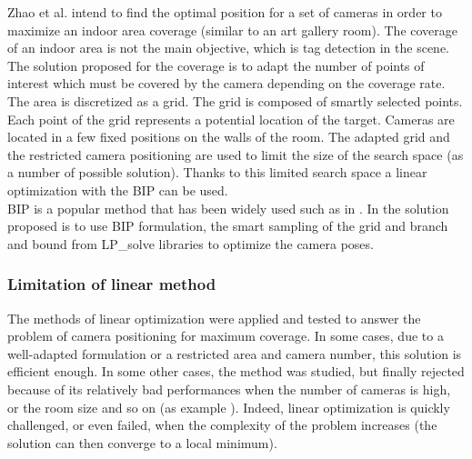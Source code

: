 Zhao  et al. \cite{22*zhao2008} intend to find the optimal position for a set of cameras in order to maximize an indoor area coverage (similar to an art gallery room). The coverage of an indoor area is not the main objective, which is tag detection in the scene. 
The solution proposed for the coverage is to adapt the number of points of interest which must be covered by the camera depending on the coverage rate. \\
The area is discretized as a grid.  The grid is composed of smartly selected points. Each point of the grid represents a potential location of the target.
Cameras are located in a few fixed positions on the walls of the room. 
The adapted grid and the restricted  camera positioning are used to limit the size of the search space (as a number of possible solution). Thanks to this limited search space a linear optimization with the BIP can be used. \\
BIP is a popular method that has been widely used such as in \cite{22*zhao2008,43*erdem2006}. In \cite{22*zhao2008} the solution proposed is to use BIP formulation, the smart sampling of the grid and branch and bound from LP\_solve libraries to optimize the camera poses.


\subsubsection{Limitation of linear method}
The methods of linear optimization were applied and tested to answer the problem of camera positioning for maximum coverage. In some cases, due to a well-adapted formulation or a restricted area and camera number, this solution is efficient enough. In some other cases, the method was studied, but finally rejected because of its relatively bad performances when the number of cameras is high, or the room size and so on (as example \cite{141*akbarzadeh2013,151*zhao2013,82*chrysostomou2012}). Indeed, linear optimization is quickly challenged, or even failed, when the complexity of the problem increases (the solution can then converge to a local minimum). 

